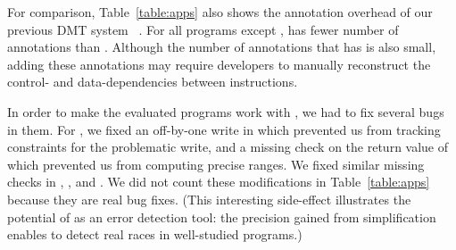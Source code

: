 For comparison, Table~\ref{table:apps} also shows the annotation overhead of our previous DMT system \tern~\cite{cui:tern:osdi10}.  For all programs except \apache, \peregrine
has fewer number of annotations than \tern.  Although the number
of annotations that \tern has is also small, adding these annotations may
require developers to manually reconstruct the control- and
data-dependencies between instructions.

In order to make the evaluated programs work with \peregrine, we had to fix several bugs
in them.  For \aget, we fixed an off-by-one write in  which
prevented us from tracking constraints for the problematic write, and a
missing check on the return value of  which prevented us from
computing precise ranges.  We fixed similar missing checks in \swaptions,
\streamcluster, and \radix.  We did not count these modifications in
Table~\ref{table:apps} because they are real bug fixes.  (This interesting
side-effect illustrates the potential of \peregrine as an error detection tool:
the precision gained from simplification enables \peregrine to detect real races
in well-studied programs.)


